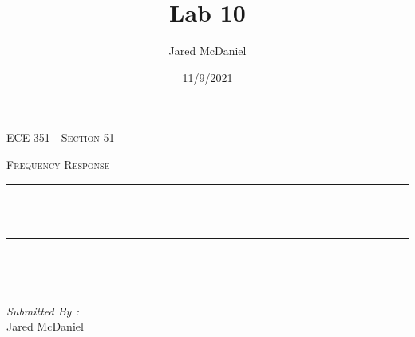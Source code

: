 \documentclass[12pt]{report}
\title{Lab 10}
\author{ Jared McDaniel}
\date{11/9/2021}
\makeatletter
\let\thetitle\@title
\makeatother
\begin{document}

\begin{titlepage}
	\centering
    \vspace*{0.5 cm}
\begin{center}    \textsc{\Large   ECE 351 - Section 51 }\\[2.0 cm]	\end{center}%
	\textsc{\Large Frequency Response  }\\[0.5 cm]				%
	\rule{\linewidth}{0.2 mm} \\[0.4 cm]
	{ \huge \bfseries \thetitle}\\
	\rule{\linewidth}{0.2 mm} \\[1.5 cm]
	
	\begin{minipage}{0.4\textwidth}
		\begin{flushleft} \large
			\end{flushleft}
			\end{minipage}~
			\begin{minipage}{0.4\textwidth}
            
			\begin{flushright} \large
			\emph{Submitted By :} \\
			Jared McDaniel  
		\end{flushright}
           
	\end{minipage}\\[2 cm]
	
    
    
    
    
	
\end{titlepage}


\tableofcontents
\pagebreak

\renewcommand{\thesection}{\arabic{section}}
\end{document}
